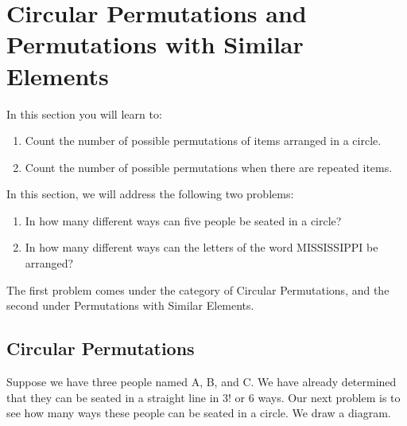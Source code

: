 \section{Circular Permutations and Permutations with Similar Elements}

In this section you will learn to:
\begin{enumerate}
    \item Count the number of possible permutations of items arranged in a circle.
    \item Count the number of possible permutations when there are repeated items.
\end{enumerate}

In this section, we will address the following two problems:
\begin{enumerate}
    \item In how many different ways can five people be seated in a circle?
    \item In how many different ways can the letters of the word MISSISSIPPI be arranged?
\end{enumerate}

The first problem comes under the category of Circular Permutations, and the second under Permutations with Similar Elements.

\subsection{Circular Permutations}

Suppose we have three people named A, B, and C. We have already determined that they can be seated in a straight line in \( 3! \) or 6 ways. Our next problem is to see how many ways these people can be seated in a circle. We draw a diagram.

\begin{center}
\end{center}

